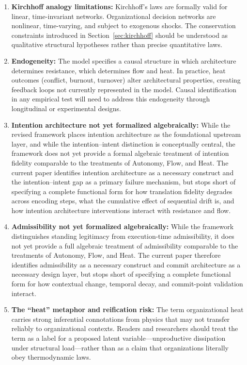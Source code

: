 \documentclass[12pt]{article}
\begin{document}
\begin{enumerate}
  \item \textbf{Kirchhoff analogy limitations:} Kirchhoff's laws are
    formally valid for linear, time-invariant networks. Organizational
    decision networks are nonlinear, time-varying, and subject to
    exogenous shocks. The conservation constraints introduced in
    Section~\ref{sec:kirchhoff} should be understood as qualitative
    structural hypotheses rather than precise quantitative laws.

  \item \textbf{Endogeneity:} The model specifies a causal structure
    in which architecture determines resistance, which determines flow
    and heat. In practice, heat outcomes (conflict, burnout, turnover)
    alter architectural properties, creating feedback loops not currently
    represented in the model. Causal identification in any empirical
    test will need to address this endogeneity through longitudinal
    or experimental designs.

  \item \textbf{Intention architecture not yet formalized algebraically:}
    While the revised framework places intention architecture as the
    foundational upstream layer, and while the intention--intent distinction
    is conceptually central, the framework does not yet provide a formal
    algebraic treatment of intention fidelity comparable to the treatments
    of Autonomy, Flow, and Heat. The current paper identifies intention
    architecture as a necessary construct and the intention--intent gap as
    a primary failure mechanism, but stops short of specifying a complete
    functional form for how translation fidelity degrades across encoding
    steps, what the cumulative effect of sequential drift is, and how
    intention architecture interventions interact with resistance and flow.

  \item \textbf{Admissibility not yet formalized algebraically:} While the
    framework distinguishes standing legitimacy from execution-time
    admissibility, it does not yet provide a full algebraic treatment of
    admissibility comparable to the treatments of Autonomy, Flow, and Heat.
    The current paper therefore identifies admissibility as a necessary
    construct and commit architecture as a necessary design layer, but stops
    short of specifying a complete functional form for how contextual change,
    temporal decay, and commit-point validation interact.

  \item \textbf{The ``heat'' metaphor and reification risk:} The term
    organizational heat carries strong inferential connotations from
    physics that may not transfer reliably to organizational contexts.
    Readers and researchers should treat the term as a label for a
    proposed latent variable---unproductive dissipation under structural
    load---rather than as a claim that organizations literally obey
    thermodynamic laws.
\end{enumerate}
\end{document}
